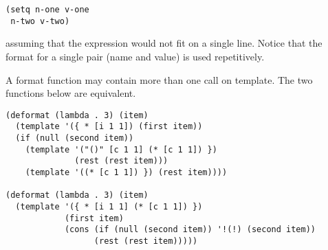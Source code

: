 \begin{verbatim}
(setq n-one v-one
 n-two v-two)
\end{verbatim}
assuming  that  the  expression  would not fit on a single line.
Notice that the format for a single pair  (name  and  value)  is
used repetitively.

  A  format function may contain more than one call on template.
The two functions below are equivalent.

\begin{verbatim}
(deformat (lambda . 3) (item)
  (template '({ * [i 1 1]) (first item))
  (if (null (second item))
    (template '("()" [c 1 1] (* [c 1 1]) })
              (rest (rest item)))
    (template '((* [c 1 1]) }) (rest item))))

(deformat (lambda . 3) (item)
  (template '({ * [i 1 1] (* [c 1 1]) })
            (first item)
            (cons (if (null (second item)) '!(!) (second item))
                  (rest (rest item)))))
\end{verbatim}
